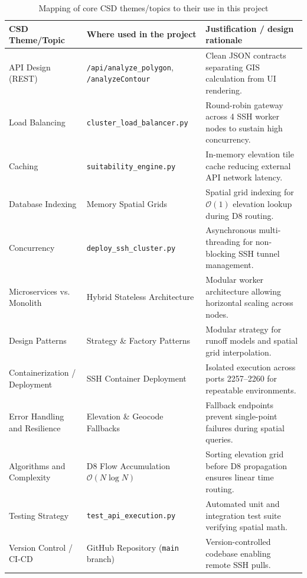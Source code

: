 \documentclass[manuscript,screen,review]{acmart}
\begin{document}
\begin{table}[t]
  \caption{Mapping of core CSD themes/topics to their use in this project}
  \label{tab:csd-themes}
  \begin{tabular}{p{3.2cm}p{4.8cm}p{6.5cm}}
    \toprule
    CSD Theme/Topic & Where used in the project & Justification / design rationale \\
    \midrule
    API Design (REST) & \texttt{/api/analyze\_polygon}, \texttt{/analyzeContour} & Clean JSON contracts separating GIS calculation from UI rendering. \\
    Load Balancing & \texttt{cluster\_load\_balancer.py} & Round-robin gateway across 4 SSH worker nodes to sustain high concurrency. \\
    Caching & \texttt{suitability\_engine.py} & In-memory elevation tile cache reducing external API network latency. \\
    Database Indexing & Memory Spatial Grids & Spatial grid indexing for $\mathcal{O}(1)$ elevation lookup during D8 routing. \\
    Concurrency & \texttt{deploy\_ssh\_cluster.py} & Asynchronous multi-threading for non-blocking SSH tunnel management. \\
    Microservices vs. Monolith & Hybrid Stateless Architecture & Modular worker architecture allowing horizontal scaling across nodes. \\
    Design Patterns & Strategy \& Factory Patterns & Modular strategy for runoff models and spatial grid interpolation. \\
    Containerization / Deployment & SSH Container Deployment & Isolated execution across ports 2257--2260 for repeatable environments. \\
    Error Handling and Resilience & Elevation \& Geocode Fallbacks & Fallback endpoints prevent single-point failures during spatial queries. \\
    Algorithms and Complexity & D8 Flow Accumulation $\mathcal{O}(N \log N)$ & Sorting elevation grid before D8 propagation ensures linear time routing. \\
    Testing Strategy & \texttt{test\_api\_execution.py} & Automated unit and integration test suite verifying spatial math. \\
    Version Control / CI-CD & GitHub Repository (\texttt{main} branch) & Version-controlled codebase enabling remote SSH pulls. \\
    \bottomrule
  \end{tabular}
\end{table}
\end{document}
